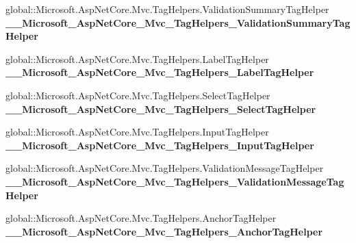 \begin{DoxyCompactItemize}
\item 
\mbox{\label{class_asp_net_core_1_1_views___items___create_afcc96280e5979d215060e8af8ccd8aa9}} 
global\+::\+Microsoft.\+Asp\+Net\+Core.\+Mvc.\+Tag\+Helpers.\+Validation\+Summary\+Tag\+Helper {\bfseries \+\_\+\+\_\+\+Microsoft\+\_\+\+Asp\+Net\+Core\+\_\+\+Mvc\+\_\+\+Tag\+Helpers\+\_\+\+Validation\+Summary\+Tag\+Helper}
\item 
\mbox{\label{class_asp_net_core_1_1_views___items___create_a1f61e808ad5858ec278f1b86520febe3}} 
global\+::\+Microsoft.\+Asp\+Net\+Core.\+Mvc.\+Tag\+Helpers.\+Label\+Tag\+Helper {\bfseries \+\_\+\+\_\+\+Microsoft\+\_\+\+Asp\+Net\+Core\+\_\+\+Mvc\+\_\+\+Tag\+Helpers\+\_\+\+Label\+Tag\+Helper}
\item 
\mbox{\label{class_asp_net_core_1_1_views___items___create_a0be12cd0aa60af9d0dcb6daeb5bd7bba}} 
global\+::\+Microsoft.\+Asp\+Net\+Core.\+Mvc.\+Tag\+Helpers.\+Select\+Tag\+Helper {\bfseries \+\_\+\+\_\+\+Microsoft\+\_\+\+Asp\+Net\+Core\+\_\+\+Mvc\+\_\+\+Tag\+Helpers\+\_\+\+Select\+Tag\+Helper}
\item 
\mbox{\label{class_asp_net_core_1_1_views___items___create_a583fb066a2307505d1fff9d3526a81bd}} 
global\+::\+Microsoft.\+Asp\+Net\+Core.\+Mvc.\+Tag\+Helpers.\+Input\+Tag\+Helper {\bfseries \+\_\+\+\_\+\+Microsoft\+\_\+\+Asp\+Net\+Core\+\_\+\+Mvc\+\_\+\+Tag\+Helpers\+\_\+\+Input\+Tag\+Helper}
\item 
\mbox{\label{class_asp_net_core_1_1_views___items___create_abb434439e2a79e3275e01487a1ddfe61}} 
global\+::\+Microsoft.\+Asp\+Net\+Core.\+Mvc.\+Tag\+Helpers.\+Validation\+Message\+Tag\+Helper {\bfseries \+\_\+\+\_\+\+Microsoft\+\_\+\+Asp\+Net\+Core\+\_\+\+Mvc\+\_\+\+Tag\+Helpers\+\_\+\+Validation\+Message\+Tag\+Helper}
\item 
\mbox{\label{class_asp_net_core_1_1_views___items___create_ae5a4daed622956c2364893a5744f1f84}} 
global\+::\+Microsoft.\+Asp\+Net\+Core.\+Mvc.\+Tag\+Helpers.\+Anchor\+Tag\+Helper {\bfseries \+\_\+\+\_\+\+Microsoft\+\_\+\+Asp\+Net\+Core\+\_\+\+Mvc\+\_\+\+Tag\+Helpers\+\_\+\+Anchor\+Tag\+Helper}
\end{DoxyCompactItemize}
